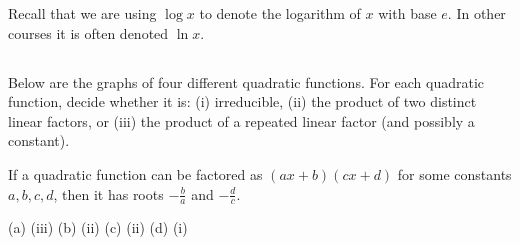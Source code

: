 %
%

\noindent
Recall that we are using $\log x$ to denote the logarithm of $x$ with
base $e$. In other courses it is often denoted $\ln x$.


\subsection*{\Conceptual}
\begin{Mquestion}
Below are the graphs of four different quadratic functions. For each quadratic function, decide whether it is: (i) irreducible, (ii) the product of two distinct linear factors, or (iii) the product of a repeated linear factor (and possibly a constant).

\hfill
{}\hfill
{}\hfill
{}


\end{Mquestion}
\begin{hint}
If a quadratic function can be factored as $(ax+b)(cx+d)$ for some constants $ a,b,c,d$, then it has roots $-\frac{b}{a}$ and $-\frac{d}{c}$.
\end{hint}
\begin{answer}
(a) (iii) \qquad (b) (ii) \qquad (c) (ii) \qquad (d) (i)
\end{answer}
